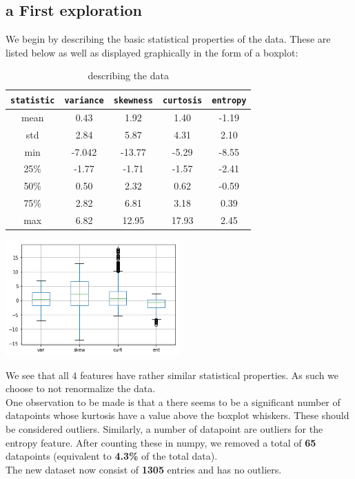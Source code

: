 \documentclass[14pt]{article}
\theoremstyle{plain}
\theoremstyle{definition}
\begin{document}
\subsection{a First exploration}
We begin by describing the basic statistical properties of the data. These are listed below as well as displayed graphically in the form of a boxplot:
\begin{table}[ht]
\begin{minipage}[b]{0.56\linewidth}
\centering
\begin{tabular}{|c| c| c |c |c|}
\hline
\texttt{statistic} & \texttt{variance} &\texttt{skewness}&\texttt{curtosis}  &\texttt{entropy} \\
	\hline
         mean &    0.43 &   1.92 &   1.40  & -1.19\\
         \hline
         std  &    2.84  &   5.87  &   4.31   &  2.10\\
         \hline
         min  &    -7.042 & -13.77  & -5.29    & -8.55\\
         \hline
         25\% &   -1.77  &  -1.71  &   -1.57  & -2.41\\
         \hline
         50\% &   0.50 &  2.32   &  0.62    &  -0.59\\
         \hline
         75\% &   2.82   &  6.81   &  3.18    &  0.39\\
         \hline
         max  &    6.82  &  12.95  &  17.93   &  2.45\\
         \hline
 \end{tabular}   
 \caption{describing the data}
    \label{table:student}
\end{minipage}\hfill
\begin{minipage}[b]{0.4\linewidth}
\centering
\includegraphics[width=67mm]{banknote_forgery_files/banknote_forgery_9_0}
\label{boxplot}
\end{minipage}
\end{table}

We see that all $4$ features have rather similar statistical properties. As such we choose to not renormalize the data.\\ 
One  observation to be made is that a there seems to be a significant number of datapoints whose kurtosis have a value above the boxplot whiskers. These should be considered outliers. Similarly, a number of datapoint are outliers for the entropy feature. After counting these in numpy, we removed a total of {\bf 65} datapoints (equivalent to {\bf 4.3\%} of the total data).\\ 
The new dataset now consist of {\bf 1305} entries and has no outliers.
\end{document}
